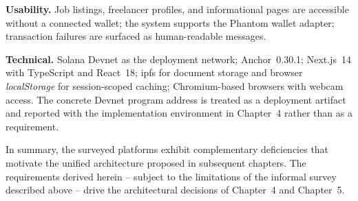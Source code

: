 \textbf{Usability.} Job listings, freelancer profiles, and informational pages are accessible without a connected wallet; the system supports the Phantom wallet adapter; transaction failures are surfaced as human-readable messages.

\textbf{Technical.} Solana Devnet as the deployment network; Anchor~0.30.1; Next.js~14 with TypeScript and React~18; \gls{ipfs} for document storage and browser \emph{localStorage} for session-scoped caching; Chromium-based browsers with webcam access. The concrete Devnet program address is treated as a deployment artifact and reported with the implementation environment in Chapter~4 rather than as a requirement.

In summary, the surveyed platforms exhibit complementary deficiencies that motivate the unified architecture proposed in subsequent chapters. The requirements derived herein -- subject to the limitations of the informal survey described above -- drive the architectural decisions of Chapter~4 and Chapter~5.
